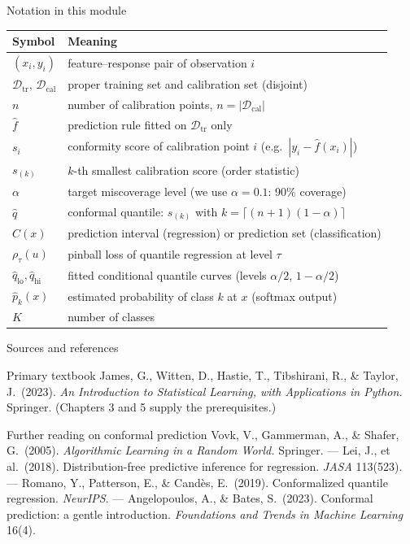 \documentclass[aspectratio=169,11pt]{beamer}
\begin{document}
\begin{frame}{Notation in this module}
  \footnotesize
  \begin{center}
  \begin{tabular}{@{}ll@{}}
    \toprule
    \textbf{Symbol} & \textbf{Meaning} \\
    \midrule
    $(x_i, y_i)$ & feature--response pair of observation $i$ \\
    $\mathcal{D}_{\text{tr}}$, $\mathcal{D}_{\text{cal}}$ & proper training set and calibration set (disjoint) \\
    $n$ & number of calibration points, $n = |\mathcal{D}_{\text{cal}}|$ \\
    $\hat f$ & prediction rule fitted on $\mathcal{D}_{\text{tr}}$ only \\
    $s_i$ & conformity score of calibration point $i$ (e.g.\ $|y_i - \hat f(x_i)|$) \\
    $s_{(k)}$ & $k$-th smallest calibration score (order statistic) \\
    $\alpha$ & target miscoverage level (we use $\alpha = 0.1$: 90\% coverage) \\
    $\hat q$ & conformal quantile: $s_{(k)}$ with $k = \lceil (n+1)(1-\alpha) \rceil$ \\
    $C(x)$ & prediction interval (regression) or prediction set (classification) \\
    $\rho_\tau(u)$ & pinball loss of quantile regression at level $\tau$ \\
    $\hat q_{\text{lo}}, \hat q_{\text{hi}}$ & fitted conditional quantile curves (levels $\alpha/2$, $1-\alpha/2$) \\
    $\hat p_k(x)$ & estimated probability of class $k$ at $x$ (softmax output) \\
    $K$ & number of classes \\
    \bottomrule
  \end{tabular}
  \end{center}
\end{frame}

\begin{frame}{Sources and references}
  \begin{block}{Primary textbook}
    James, G., Witten, D., Hastie, T., Tibshirani, R., \& Taylor, J.\ (2023).
    \emph{An Introduction to Statistical Learning, with Applications in
    Python.} Springer. (Chapters 3 and 5 supply the prerequisites.)
  \end{block}
  \begin{block}{Further reading on conformal prediction}
    \footnotesize
    Vovk, V., Gammerman, A., \& Shafer, G.\ (2005). \emph{Algorithmic Learning in a
    Random World.} Springer. ---
    Lei, J., et al.\ (2018). Distribution-free predictive inference for regression.
    \emph{JASA} 113(523). ---
    Romano, Y., Patterson, E., \& Cand\`es, E.\ (2019). Conformalized quantile
    regression. \emph{NeurIPS}. ---
    Angelopoulos, A., \& Bates, S.\ (2023). Conformal prediction: a gentle introduction.
    \emph{Foundations and Trends in Machine Learning} 16(4).
  \end{block}
\end{frame}
\end{document}
